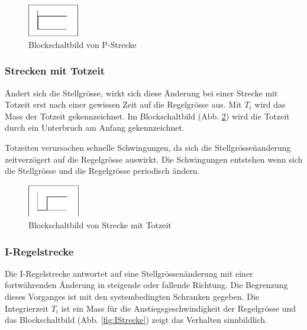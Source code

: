 \begin{figure}[h!, width=\pagewidth]
    \centering
    \includegraphics[width=0.2\textwidth]{images/PStrecke}
    \caption{Blockschaltbild von P-Strecke}
    \label{fig:PStrecke}
\end{figure}


\subsubsection*{Strecken mit Totzeit}

\"Andert  sich  die  Stellgr\"osse,  wirkt sich  diese  \"Anderung  bei  einer
Strecke  mit Totzeit  erst  nach  einer gewissen  Zeit  auf die  Regelgr\"osse
aus. Mit $T_t$  wird das  Mass der Totzeit  gekennzeichnet. Im Blockschaltbild
(Abb.  \ref{fig:TotZeit}) wird  die  Totzeit durch  ein  Unterbruch am  Anfang
gekennzeichnet.

Totzeiten     verursachen    schnelle     Schwingungen,     da    sich     die
Stellgr\"osse\"nanderung zeitverz\"ogert  auf die  Regelgr\"osse auswirkt. Die
Schwingungen  entstehen  wenn sich  die  Stellgr\"osse  und die  Regelgr\"osse
periodisch \"andern.

\begin{figure}[h!, width=\pagewidth]
    \centering
    \includegraphics[width=0.2\textwidth]{images/TotZeit}
    \caption{Blockschaltbild von Strecke mit Totzeit}
    \label{fig:TotZeit}
\end{figure}


\subsubsection*{I-Regelstrecke}

Die  I-Regelstrecke  antwortet  auf eine  Stellgr\"ossen\"anderung  mit  einer
fortw\"ahrenden \"Anderung in steigende oder fallende Richtung. Die Begrenzung
dieses   Vorganges  ist   mit  den   systembedingten  Schranken   gegeben. Die
Integrierzeit  $T_i$  ist  ein  Mass  f\"ur  die  Anstiegsgeschwindigkeit  der
Regelgr\"osse  und das  Blockschaltbild  (Abb.  \ref{fig:IStrecke}) zeigt  das
Verhalten sinnbildlich.

